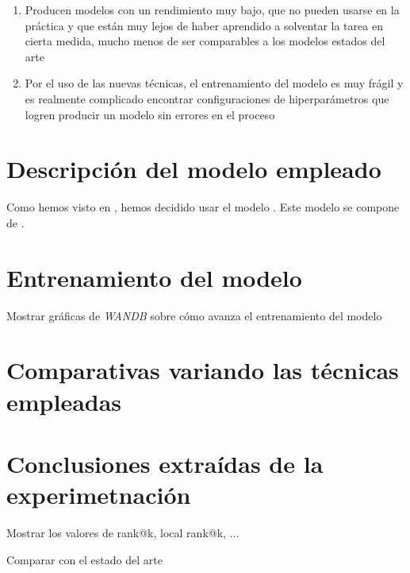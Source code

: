 \begin{enumerate}
    \item Producen modelos con un rendimiento muy bajo, que no pueden usarse en la práctica y que están muy lejos de haber aprendido a solventar la tarea en cierta medida, mucho menos de ser comparables a los modelos estados del arte
    \item Por el uso de las nuevas técnicas, el entrenamiento del modelo es muy frágil y es realmente complicado encontrar configuraciones de hiperparámetros que logren producir un modelo sin errores en el proceso
\end{enumerate}

\section{Descripción del modelo empleado} \label{isec:explicacion_modelo}

Como hemos visto en , hemos decidido usar el modelo . Este modelo se compone de .


\section{Entrenamiento del modelo} \label{isec:entrenamiento_mejor_modelo}

Mostrar gráficas de \textit{WANDB} sobre cómo avanza el entrenamiento del modelo

\section{Comparativas variando las técnicas empleadas} \label{isec:experimentacion_variar_tecnicas}

\section{Conclusiones extraídas de la experimetnación} \label{isec:conclusiones_experimentacion}

Mostrar los valores de rank@k, local rank@k, ...

Comparar con el estado del arte
